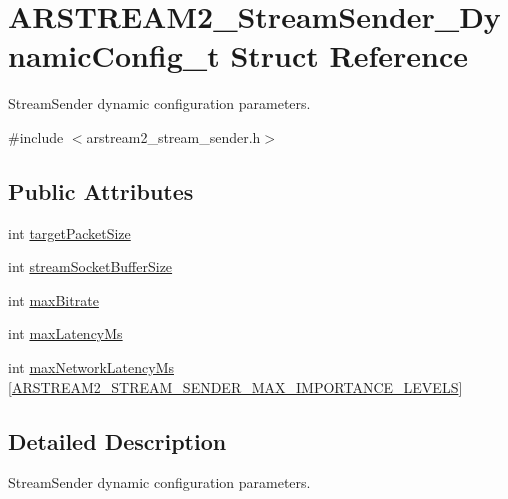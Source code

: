 \hypertarget{struct_a_r_s_t_r_e_a_m2___stream_sender___dynamic_config__t}{}\section{A\+R\+S\+T\+R\+E\+A\+M2\+\_\+\+Stream\+Sender\+\_\+\+Dynamic\+Config\+\_\+t Struct Reference}
\label{struct_a_r_s_t_r_e_a_m2___stream_sender___dynamic_config__t}


Stream\+Sender dynamic configuration parameters.  




{\ttfamily \#include $<$arstream2\+\_\+stream\+\_\+sender.\+h$>$}

\subsection*{Public Attributes}
\begin{DoxyCompactItemize}
\item 
int \hyperlink{struct_a_r_s_t_r_e_a_m2___stream_sender___dynamic_config__t_a3f6f15a150d59956f6ef79fc00c717da}{target\+Packet\+Size}
\item 
int \hyperlink{struct_a_r_s_t_r_e_a_m2___stream_sender___dynamic_config__t_a9cf6bbe82c5525764f8fd5d100549306}{stream\+Socket\+Buffer\+Size}
\item 
int \hyperlink{struct_a_r_s_t_r_e_a_m2___stream_sender___dynamic_config__t_a0a2121981508b21a6f9a453ad8aac19a}{max\+Bitrate}
\item 
int \hyperlink{struct_a_r_s_t_r_e_a_m2___stream_sender___dynamic_config__t_a3ee045fe349b089cd4c49f1cffb32441}{max\+Latency\+Ms}
\item 
int \hyperlink{struct_a_r_s_t_r_e_a_m2___stream_sender___dynamic_config__t_aeeb00076e0adec8902d4e712b0b80ace}{max\+Network\+Latency\+Ms} \mbox{[}\hyperlink{arstream2__stream__stats_8h_ab4197b48e3f5b7133448bee1bae350e7}{A\+R\+S\+T\+R\+E\+A\+M2\+\_\+\+S\+T\+R\+E\+A\+M\+\_\+\+S\+E\+N\+D\+E\+R\+\_\+\+M\+A\+X\+\_\+\+I\+M\+P\+O\+R\+T\+A\+N\+C\+E\+\_\+\+L\+E\+V\+E\+LS}\mbox{]}
\end{DoxyCompactItemize}


\subsection{Detailed Description}
Stream\+Sender dynamic configuration parameters. 

